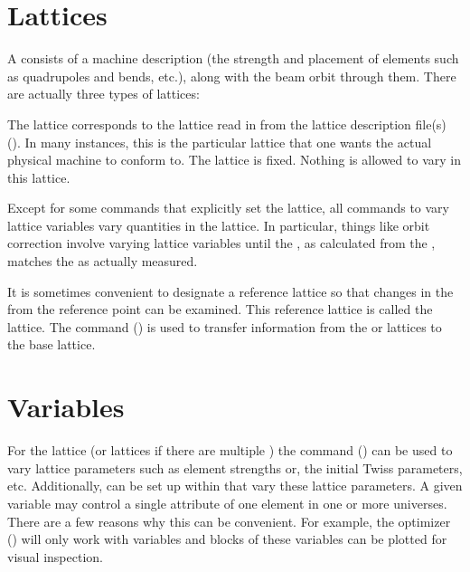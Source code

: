 \section{Lattices}
\label{s:lattice}

A  consists of a machine description (the strength and
placement of elements such as quadrupoles and bends, etc.), along with the
beam orbit through them. There are actually three types of lattices:
  \vspace*{-3ex}
  \begin{description}
  \item[Design Lattice] \Newline 
The  lattice corresponds to the lattice read in from the
lattice description file(s) (). In many instances, this
is the particular lattice that one wants the actual physical machine
to conform to. The  lattice is fixed. Nothing is allowed to
vary in this lattice.
  \item[Model Lattice] \Newline
Except for some commands that explicitly set the  lattice,
all \tao commands to vary lattice variables vary quantities in the
 lattice. In particular, things like orbit correction
involve varying  lattice variables until the ,
as calculated from the , matches the  as actually measured.
  \item[Base Lattice] \Newline
It is sometimes convenient to designate a reference lattice so that
changes in the  from the reference point can be examined.
This reference lattice is called the  lattice. The 
command () is used to transfer information from the
 or  lattices to the base lattice.
  \end{description}

\section{Variables}
\label{s:variable.overview}

For the  lattice (or lattices if there are multiple
) the  command () can be used
to vary lattice parameters such as element strengths or, the initial
Twiss parameters, etc.  Additionally,  can be set up
within \tao that vary these  lattice parameters.  A given
\tao variable may control a single attribute of one element in one or
more universes.  There are a few reasons why this can be convenient.
For example, the optimizer () will only work with
\tao variables and blocks of these variables can be plotted for visual
inspection.

